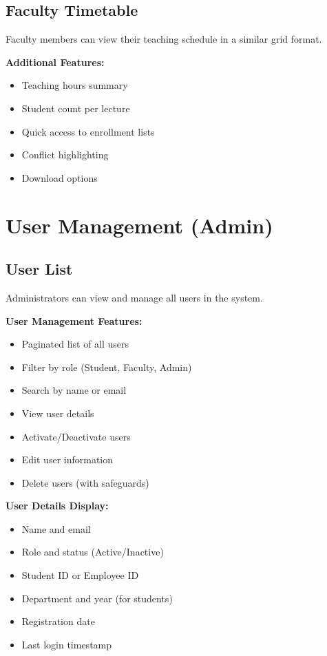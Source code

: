 \subsection{Faculty Timetable}
Faculty members can view their teaching schedule in a similar grid format.

\textbf{Additional Features:}
\begin{itemize}
    \item Teaching hours summary
    \item Student count per lecture
    \item Quick access to enrollment lists
    \item Conflict highlighting
    \item Download options
\end{itemize}

\section{User Management (Admin)}

\subsection{User List}
Administrators can view and manage all users in the system.

\textbf{User Management Features:}
\begin{itemize}
    \item Paginated list of all users
    \item Filter by role (Student, Faculty, Admin)
    \item Search by name or email
    \item View user details
    \item Activate/Deactivate users
    \item Edit user information
    \item Delete users (with safeguards)
\end{itemize}

\textbf{User Details Display:}
\begin{itemize}
    \item Name and email
    \item Role and status (Active/Inactive)
    \item Student ID or Employee ID
    \item Department and year (for students)
    \item Registration date
    \item Last login timestamp
\end{itemize}

